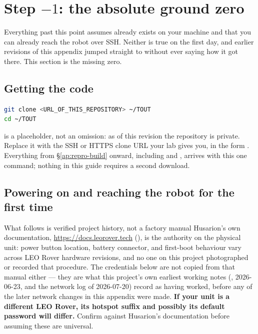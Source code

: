 \section{Step $-1$: the absolute ground zero}
\label{ap:repro-groundzero}
Everything past this point assumes  already exists
on your machine and that you can already reach the robot over SSH. Neither is
true on the first day, and earlier revisions of this appendix jumped straight
to  without ever saying how it got there. This
section is the missing zero.

\subsection{Getting the code}
\label{ap:repro-clone}
\begin{lstlisting}[language=bash]
git clone <URL_OF_THIS_REPOSITORY> ~/TOUT
cd ~/TOUT
\end{lstlisting}
 is a placeholder, not an omission: as of
this revision the repository is private. Replace it with the SSH or HTTPS
clone URL your lab gives you, in the form
. Everything from
\S\ref{ap:repro-build} onward, including  and
, arrives with this one command; nothing in this
guide requires a second download.

\subsection{Powering on and reaching the robot for the first time}
\label{ap:repro-firstboot}
\begin{trapbox}{What follows is verified project history, not a factory
manual}
Husarion's own documentation, \url{https://docs.leorover.tech}
(\cite{husarion2021leo}), is the authority on the physical unit: power
button location, battery connector, and first-boot behaviour vary across LEO
Rover hardware revisions, and no one on this project photographed or
recorded that procedure. The credentials below are not copied from that
manual either --- they are what this project's own earliest working notes
(, 2026-06-23, and the network log of
2026-07-20) record as having worked, before any of the later network
changes in this appendix were made. \textbf{If your unit is a different LEO
Rover, its hotspot suffix and possibly its default password will differ.}
Confirm against Husarion's documentation before assuming these are
universal.
\end{trapbox}

